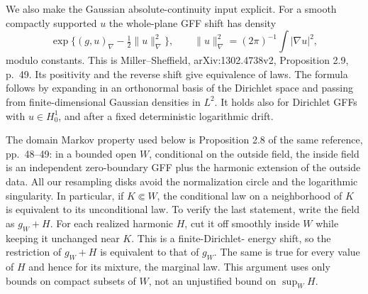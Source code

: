 \documentclass[12pt]{amsart}
\numberwithin{equation}{section}
\begin{document}
We also make the Gaussian absolute-continuity input explicit.
For a smooth compactly supported $u$ the whole-plane GFF shift
has density
\begin{equation}\label{s11-pinch:eq:CM-C}
 \exp\{(g,u)_\nabla-\tfrac12\|u\|_\nabla^2\},
 \qquad \|u\|_\nabla^2=(2\pi)^{-1}\int|\nabla u|^2,
\end{equation}
modulo constants. This is Miller--Sheffield,
arXiv:1302.4738v2, Proposition 2.9, p.~49.
Its positivity and the reverse shift give equivalence of laws.
The formula follows by expanding in an orthonormal basis of the
Dirichlet space and passing from finite-dimensional Gaussian
densities in $L^2$. It holds also for Dirichlet GFFs with
$u\in H_0^1$, and after a fixed deterministic logarithmic drift.

The domain Markov property used below is Proposition 2.8 of the
same reference, pp.~48--49: in a bounded open $W$, conditional
on the outside field, the inside field is an independent
zero-boundary GFF plus the harmonic extension of the outside
data. All our resampling disks avoid the normalization circle
and the logarithmic singularity.
In particular, if $K\Subset W$, the conditional law on a
neighborhood of $K$ is equivalent to its unconditional law.
To verify the last statement, write the field as $g_W+H$.
For each realized harmonic $H$, cut it off smoothly inside $W$
while keeping it unchanged near $K$. This is a finite-Dirichlet-
energy shift, so the restriction of $g_W+H$ is equivalent to
that of $g_W$. The same is true for every value of $H$ and hence
for its mixture, the marginal law. This argument uses only
bounds on compact subsets of $W$, not an unjustified bound
on $\sup_W H$.
\end{document}
